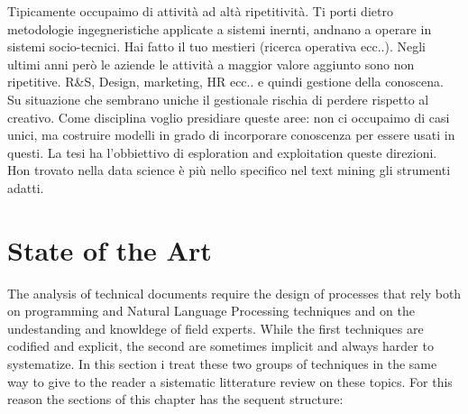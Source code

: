 \documentclass[]{book}
\begin{document}
Tipicamente occupaimo di attività ad altà ripetitività. Ti porti dietro
metodologie ingegneristiche applicate a sistemi inernti, andnano a
operare in sistemi socio-tecnici. Hai fatto il tuo mestieri (ricerca
operativa ecc..). Negli ultimi anni però le aziende le attività a
maggior valore aggiunto sono non ripetitive. R\&S, Design, marketing, HR
ecc.. e quindi gestione della conoscena. Su situazione che sembrano
uniche il gestionale rischia di perdere rispetto al creativo. Come
disciplina voglio presidiare queste aree: non ci occupaimo di casi
unici, ma costruire modelli in grado di incorporare conoscenza per
essere usati in questi. La tesi ha l'obbiettivo di esploration and
exploitation queste direzioni. Hon trovato nella data science è più
nello specifico nel text mining gli strumenti adatti.

\chapter{State of the Art}\label{sota}

The analysis of technical documents require the design of processes that
rely both on programming and Natural Language Processing techniques and
on the undestanding and knowldege of field experts. While the first
techniques are codified and explicit, the second are sometimes implicit
and always harder to systematize. In this section i treat these two
groups of techniques in the same way to give to the reader a sistematic
litterature review on these topics. For this reason the sections of this
chapter has the sequent structure:
\end{document}
